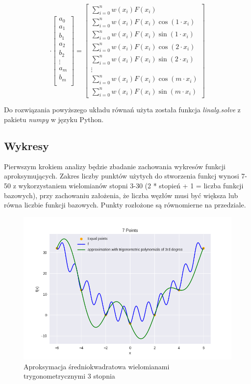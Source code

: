 \documentclass{article}
\begin{document}
\[
\cdot
\begin{bmatrix}
    a_0 \\
    a_1 \\
    b_1 \\
    a_2 \\
    b_2 \\
    \vdots \\
    a_m \\
    b_m \\ 
\end{bmatrix}
=
\begin{bmatrix}
    \sum_{i=0}^nw(x_i)F(x_i) \\
    \sum_{i=0}^nw(x_i)F(x_i)\cos(1\cdot x_i) \\
    \sum_{i=0}^nw(x_i)F(x_i)\sin(1\cdot x_i) \\
    \sum_{i=0}^nw(x_i)F(x_i)\cos(2\cdot x_i) \\
    \sum_{i=0}^nw(x_i)F(x_i)\sin(2\cdot x_i) \\
    \vdots \\
    \sum_{i=0}^nw(x_i)F(x_i)\cos(m\cdot x_i) \\ 
    \sum_{i=0}^nw(x_i)F(x_i)\sin(m\cdot x_i)
\end{bmatrix}    
\]

Do rozwiązania powyższego układu równań użyta została funkcja \textit{linalg.solve} z pakietu \textit{numpy}
w języku Python.

\subsection{Wykresy}
Pierwszym krokiem analizy będzie zbadanie zachowania wykresów funkcji aproksymujących. Zakres liczby punktów użytych do
stworzenia funkcj wynosi 7-50 z wykorzystaniem wielomianów stopni 3-30 (2 * stopień + 1 = liczba funkcji bazowych), przy 
zachowaniu założenia, że liczba węzłów musi być większa lub równa liczbie funkcji bazowych. Punkty rozłożone są
równomierne na przedziale.

\begin{figure}[H]
    \centering
    \includegraphics[width=\textwidth]{img/tripoly_3_7.png}
    \caption{Aproksymacja średniokwadratowa wielomianami trygonometrycznymi 3 stopnia}
\end{figure}
\end{document}
